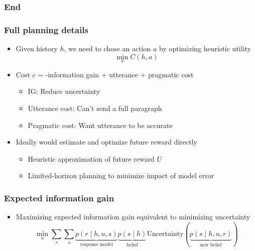 \documentclass{beamer}
\begin{document}
\begin{frame}
\frametitle{End}
\end{frame}

\begin{frame}
\frametitle{Full planning details}
\begin{itemize}
\item Given history $h$,
we need to chose an action $a$ by optimizing heuristic utility
\begin{equation*}
\min_a C(h, a)
\end{equation*}
\item Cost $c$ = -information gain + utterance + pragmatic cost
    \begin{itemize}
    \item IG: Reduce uncertainty
    \item Utterance cost: Can't send a full paragraph
    \item Pragmatic cost: Want utterance to be accurate
    \end{itemize}
\item Ideally would estimate and optimize future reward directly
    \begin{itemize}
    \item Heuristic approximation of future reward $U$
    \item Limited-horizon planning to minimize impact of model error
    \end{itemize}
\end{itemize}
\end{frame}

\begin{frame}
\frametitle{Expected information gain}
\begin{itemize}
\item Maximizing expected information gain equivalent to minimizing uncertainty
$$\min_u \sum_r\sum_s
    \underbrace{p(r\mid h,u,s)}_{\text{response model}}
    \underbrace{p(s\mid h)}_{\text{belief}}
    \text{Uncertainty}(\underbrace{p(s \mid h,u,r)}_{\text{new belief}})$$
\end{itemize}
\end{frame}
\end{document}
